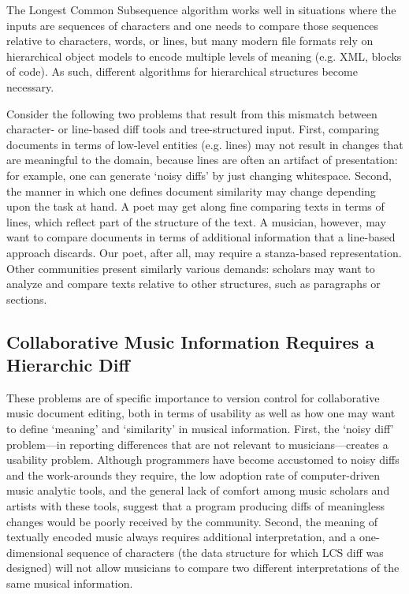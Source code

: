 \documentclass{article}
\begin{document}
The Longest Common Subsequence algorithm works well in situations where
the inputs are sequences of characters and one needs to compare those sequences relative to characters, words, or
lines, but many modern file formats rely on
hierarchical object models to encode multiple levels of meaning
(e.g. XML, blocks of code).  As such, different algorithms for
hierarchical structures become necessary.  

Consider the following two problems that result from this mismatch
between character- or line-based diff tools and tree-structured input.
First, comparing documents in terms of low-level entities
(e.g. lines) may not result in changes that are meaningful to the
domain, because lines are often an artifact of presentation: for
example, one can generate `noisy diffs' by just changing whitespace.
Second, the manner in which one defines document similarity may change
depending upon the task at hand.  A poet may get along fine comparing
texts in terms of lines, which reflect part of the structure of the
text.  A musician, however, may want to compare documents in terms of
additional information that a line-based approach discards. Our poet, after all, may require a stanza-based representation.
Other communities present similarly various demands: scholars may want
to analyze and compare texts relative to other structures, such as
paragraphs or sections.

\subsection{Collaborative Music Information Requires a Hierarchic Diff}
These problems are of specific importance to version control for collaborative music document editing, both in terms of usability as well as how one may want
to define `meaning' and `similarity' in musical information.  First,
the `noisy diff' problem---in reporting differences that are not
relevant to musicians---creates a usability problem.  Although
programmers have become accustomed to noisy diffs and the work-arounds
they require, the low adoption rate of computer-driven music analytic
tools, and the general lack of comfort among music scholars and artists with these
tools, suggest that a program producing diffs of meaningless changes
would be poorly received by the community.  Second, the meaning of
textually encoded music always requires additional interpretation, and a one-dimensional sequence of characters (the data
structure for which LCS diff was designed) will not allow
musicians to compare two different interpretations of the same musical information.  
\end{document}
